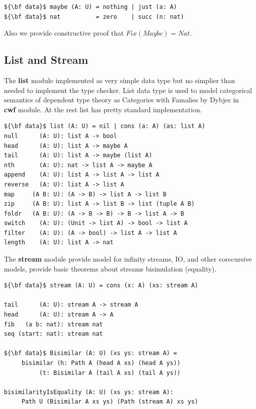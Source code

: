 \documentclass{article}
\begin{document}
\begin{lstlisting}[mathescape=true]
${\bf data}$ maybe (A: U) = nothing | just (a: A)
${\bf data}$ nat          = zero    | succ (n: nat)
\end{lstlisting}

Also we provide constructive proof that $Fix(Maybe) = Nat$.

\subsection{List and Stream}

The {\bf list} module implemented as very simple data type but no simplier
than needed to implement the type checker. List data type is
used to model categorical semantics of dependent type theory
as Categories with Famalies by Dybjer in {\bf cwf} module.
At the rest list has pretty standard implementation.

\begin{lstlisting}[mathescape=true]
${\bf data}$ list (A: U) = nil | cons (a: A) (as: list A)
null      (A: U): list A -> bool
head      (A: U): list A -> maybe A
tail      (A: U): list A -> maybe (list A)
nth       (A: U): nat -> list A -> maybe A
append    (A: U): list A -> list A -> list A
reverse   (A: U): list A -> list A
map     (A B: U): (A -> B) -> list A -> list B
zip     (A B: U): list A -> list B -> list (tuple A B)
foldr   (A B: U): (A -> B -> B) -> B -> list A -> B
switch    (A: U): (Unit -> list A) -> bool -> list A
filter    (A: U): (A -> bool) -> list A -> list A
length    (A: U): list A -> nat
\end{lstlisting}

The {\bf stream} module provide model for infinity streams, IO, and other corecursive models,
provide basic theorems about streams bisimulation (equality).

\begin{lstlisting}[mathescape=true]
${\bf data}$ stream (A: U) = cons (x: A) (xs: stream A)

tail      (A: U): stream A -> stream A
head      (A: U): stream A -> A
fib   (a b: nat): stream nat
seq (start: nat): stream nat

${\bf data}$ Bisimilar (A: U) (xs ys: stream A) =
     bisimilar (h: Path A (head A xs) (head A ys))
          (t: Bisimilar A (tail A xs) (tail A ys))

bisimilarityIsEquality (A: U) (xs ys: stream A):
     Path U (Bisimilar A xs ys) (Path (stream A) xs ys)
\end{lstlisting}
\end{document}
